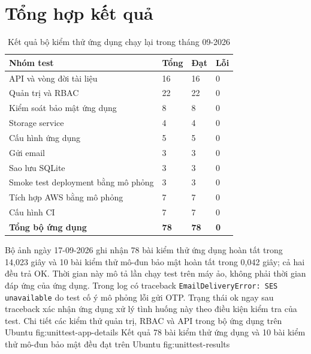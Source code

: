 \section{Tổng hợp kết quả}
\begin{table}[htbp]\centering\small
\caption{Kết quả bộ kiểm thử ứng dụng chạy lại trong tháng 09-2026}
\begin{tabularx}{\textwidth}{X P{1.5cm}P{1.5cm}P{1.5cm}}\toprule
\textbf{Nhóm test}&\textbf{Tổng}&\textbf{Đạt}&\textbf{Lỗi}\\\midrule
API và vòng đời tài liệu &16&16&0\\
Quản trị và RBAC &22&22&0\\
Kiểm soát bảo mật ứng dụng &8&8&0\\
Storage service &4&4&0\\
Cấu hình ứng dụng &5&5&0\\
Gửi email &3&3&0\\
Sao lưu SQLite &3&3&0\\
Smoke test deployment bằng mô phỏng &3&3&0\\
Tích hợp AWS bằng mô phỏng &7&7&0\\
Cấu hình CI &7&7&0\\\midrule
\textbf{Tổng bộ ứng dụng}&\textbf{78}&\textbf{78}&\textbf{0}\\\bottomrule
\end{tabularx}\end{table}
Bộ ảnh ngày 17-09-2026 ghi nhận 78 bài kiểm thử ứng dụng hoàn tất trong 14,023 giây và 10 bài kiểm thử mô-đun bảo mật hoàn tất trong 0,042 giây; cả hai đều trả OK. Thời gian này mô tả lần chạy test trên máy ảo, không phải thời gian đáp ứng của ứng dụng. Trong log có traceback \texttt{EmailDeliveryError: SES unavailable} do test cố ý mô phỏng lỗi gửi OTP. Trạng thái ok ngay sau traceback xác nhận ứng dụng xử lý tình huống này theo điều kiện kiểm tra của test.
{Chi tiết các kiểm thử quản trị, RBAC và API trong bộ ứng dụng trên Ubuntu}
{fig:unittest-app-details}
{Kết quả 78 bài kiểm thử ứng dụng và 10 bài kiểm thử mô-đun bảo mật đều đạt trên Ubuntu}
{fig:unittest-results}
